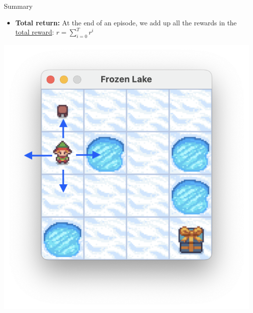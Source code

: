 \documentclass[aspectratio=169,xcolor=dvipsnames]{beamer}
\begin{document}
\begin{frame}{Summary}
\begin{minipage}{0.8\textwidth}
\begin{itemize}
        \item \textbf{Total return:} At the end of an episode, we add up all the rewards in the \underline{total reward}: $r = \sum_{i=0}^T r^i$
    \end{itemize}
\end{minipage}%
\hspace{0.01\textwidth}
\begin{minipage}{0.1\textwidth} 
    \hspace{-9pt}
    \begin{minipage}{\textwidth}
        \centering
        \includegraphics[scale=0.23]{images/moving-agent.png}
    \end{minipage}
    \vspace{-20pt}
    \vfill %
    \begin{minipage}{\textwidth}
        \centering

\end{minipage}
\end{minipage}
\end{frame}
\end{document}
